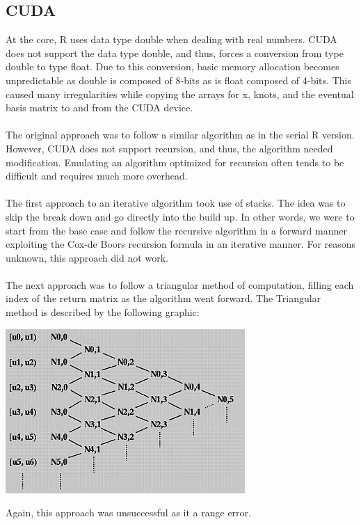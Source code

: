\subsection{CUDA} %
At the core, R uses data type double when dealing with real numbers. CUDA does not support the data type double, and thus, forces a conversion from type double to type float. Due to this conversion, basic memory allocation becomes unpredictable as double is composed of 8-bits as is float composed of 4-bits. This caused many irregularities while copying the arrays for x, knots, and the eventual basis matrix to and from the CUDA device.
\\ \\
The original approach was to follow a similar algorithm as in the serial R version. However, CUDA does not support recursion, and thus, the algorithm needed modification. Emulating an algorithm optimized for recursion often tends to be difficult and requires much more overhead.
\\ \\
The first approach to an iterative algorithm took use of stacks. The idea was to skip the break down and go directly into the build up. In other words, we were to start from the base case and follow the recursive algorithm in a forward manner exploiting the Cox-de Boors recursion formula in an iterative manner. For reasons unknown, this approach did not work.
\\ \\
The next approach was to follow a triangular method of computation, filling each index of the return matrix as the algorithm went forward. The Triangular method is described by the following graphic:
\begin{center} \includegraphics[scale=.6]{triangle.jpg} \end{center}
Again, this approach was unsuccessful as it a range error.
\\ \\
